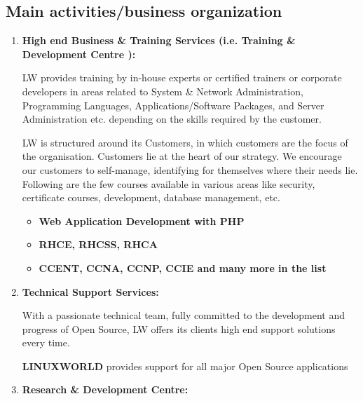 \documentclass[12pt,oneside,a4paper]{report}
\begin{document}
\subsection{Main activities/business organization}
\begin{enumerate}
\item{\textbf{High end Business \& Training Services (i.e. Training \& Development Centre ):}}\\\vspace{5.0mm}

LW provides training by in-house experts or certified trainers or corporate developers in areas related to System \& Network Administration, Programming Languages, Applications/Software Packages, and Server Administration etc. depending on the skills required by the customer.

LW is structured around its Customers, in which customers are the focus of the organisation. Customers lie at the heart of our strategy. We encourage our customers to self-manage, identifying for themselves where their needs lie. Following are the few courses available in various areas like security, certificate courses, development, database management, etc.\\\vspace{5.0mm}
\begin{itemize}
\item{\textbf{Web Application Development with PHP}}\\
\item{\textbf{RHCE, RHCSS, RHCA}}\\
\item{\textbf{CCENT, CCNA, CCNP, CCIE and many more in the list}}
\end{itemize}

\item{\textbf{Technical Support Services:}}

With a passionate technical team, fully committed to the development and progress of Open Source, LW offers its clients high end support solutions every time.

\textbf{LINUXWORLD} provides support for all major Open Source applications
\vspace{2.0mm}
\item{\textbf{Research \& Development Centre:}}


\end{enumerate}
\end{document}
